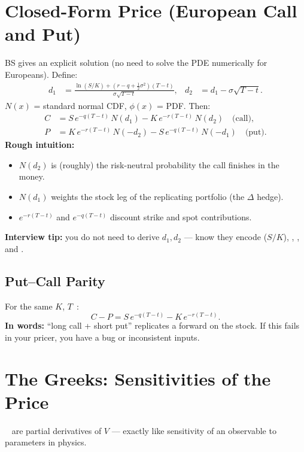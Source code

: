\section{Closed-Form Price (European Call and Put)}
\label{sec:bs-closed-form}
BS gives an explicit solution (no need to solve the PDE numerically for Europeans). Define:
\begin{align}
  d_1 &= \frac{\ln(S/K) + (r - q + \tfrac{1}{2}\sigma^2)(T-t)}{\sigma\sqrt{T-t}} ,
  &
  d_2 &= d_1 - \sigma\sqrt{T-t} .
  \label{eq:d1d2}
\end{align}
$N(x)$ = standard normal CDF, $\phi(x)$ = PDF. Then:
\begin{align}
  C &= S\,e^{-q(T-t)}\,N(d_1) - K\,e^{-r(T-t)}\,N(d_2) \quad\text{(call)}, \\
  P &= K\,e^{-r(T-t)}\,N(-d_2) - S\,e^{-q(T-t)}\,N(-d_1) \quad\text{(put)}.
\end{align}
\textbf{Rough intuition:}
\begin{itemize}
    \item $N(d_2)$ is (roughly) the risk-neutral probability the call finishes in the money.
    \item $N(d_1)$ weights the stock leg of the replicating portfolio (the $\Delta$ hedge).
    \item $e^{-r(T-t)}$ and $e^{-q(T-t)}$ discount strike and spot contributions.
\end{itemize}
\par\noindent\textbf{Interview tip:} you do not need to derive $d_1,d_2$ --- know they encode 
 ($S/K$), , , and .

\subsection{Put--Call Parity}
\label{subsec:put-call-parity}
For the same $K$, $T$~\cite{wiki-put-call-parity}:
\begin{equation}
  C - P = S\,e^{-q(T-t)} - K\,e^{-r(T-t)} .
  \label{eq:put-call-parity}
\end{equation}
\textbf{In words:} ``long call + short put'' replicates a forward on the stock. 
If this fails in your pricer, you have a bug or inconsistent inputs.

\section{The Greeks: Sensitivities of the Price}
\label{sec:greeks}
~\cite{wiki-greeks} are partial derivatives of $V$ --- exactly like 
sensitivity of an observable to parameters in physics.

